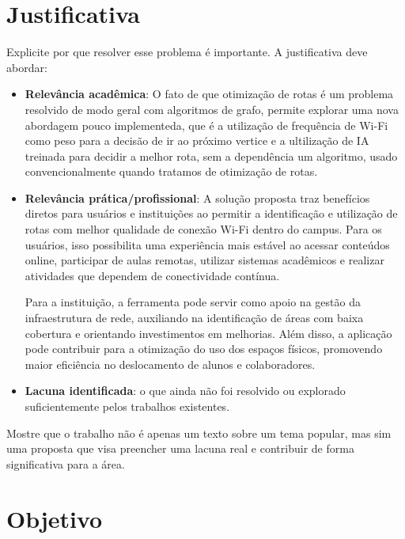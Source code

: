 \documentclass[
    12pt,                %
    openright,           %
    oneside,             %
    a4paper,             %
    english,             %
    brazil               %
]{abntex2}
\begin{document}
\section{Justificativa}
\label{sec:justificativa}

Explicite por que resolver esse problema é importante. A justificativa deve abordar:

\begin{itemize}
    \item \textbf{Relevância acadêmica}: O fato de que otimização de rotas é um problema resolvido de modo geral
    com algoritmos de grafo, permite explorar uma nova abordagem pouco implementeda, que é a utilização de frequência
    de Wi-Fi como peso para a decisão de ir ao próximo vertice e a ultilização de IA treinada para decidir a melhor rota,
    sem a dependência um algoritmo, usado convencionalmente quando tratamos de otimização de rotas.

    \item \textbf{Relevância prática/profissional}: A solução proposta traz benefícios diretos para usuários e 
    instituições ao permitir a identificação e utilização de rotas com melhor qualidade de conexão Wi-Fi dentro 
    do campus. Para os usuários, isso possibilita uma experiência mais estável ao acessar conteúdos online, 
    participar de aulas remotas, utilizar sistemas acadêmicos e realizar atividades que dependem de conectividade 
    contínua.\newline

    Para a instituição, a ferramenta pode servir como apoio na gestão da infraestrutura de rede, 
    auxiliando na identificação de áreas com baixa cobertura e orientando investimentos em melhorias. 
    Além disso, a aplicação pode contribuir para a otimização do uso dos espaços físicos, promovendo 
    maior eficiência no deslocamento de alunos e colaboradores.

    \item \textbf{Lacuna identificada}: o que ainda não foi resolvido ou explorado suficientemente pelos trabalhos existentes.
\end{itemize}

Mostre que o trabalho não é apenas um texto sobre um tema popular, mas sim uma proposta que visa preencher uma lacuna real e contribuir de forma significativa para a área.

\section{Objetivo}
\label{sec:objetivo}
\end{document}
